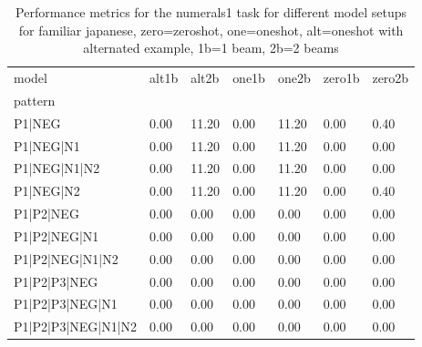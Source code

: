 \begin{table}[h]
\begin{tabular}{l|llllll}
\toprule
model & alt1b & alt2b & one1b & one2b & zero1b & zero2b \\
pattern &  &  &  &  &  &  \\
\midrule
P1|NEG & 0.00 & 11.20 & 0.00 & 11.20 & 0.00 & 0.40 \\
P1|NEG|N1 & 0.00 & 11.20 & 0.00 & 11.20 & 0.00 & 0.00 \\
P1|NEG|N1|N2 & 0.00 & 11.20 & 0.00 & 11.20 & 0.00 & 0.00 \\
P1|NEG|N2 & 0.00 & 11.20 & 0.00 & 11.20 & 0.00 & 0.40 \\
P1|P2|NEG & 0.00 & 0.00 & 0.00 & 0.00 & 0.00 & 0.00 \\
P1|P2|NEG|N1 & 0.00 & 0.00 & 0.00 & 0.00 & 0.00 & 0.00 \\
P1|P2|NEG|N1|N2 & 0.00 & 0.00 & 0.00 & 0.00 & 0.00 & 0.00 \\
P1|P2|P3|NEG & 0.00 & 0.00 & 0.00 & 0.00 & 0.00 & 0.00 \\
P1|P2|P3|NEG|N1 & 0.00 & 0.00 & 0.00 & 0.00 & 0.00 & 0.00 \\
P1|P2|P3|NEG|N1|N2 & 0.00 & 0.00 & 0.00 & 0.00 & 0.00 & 0.00 \\
\bottomrule
\end{tabular}
\caption{Performance metrics for the numerals1 task for different model setups for familiar japanese, zero=zeroshot, one=oneshot, alt=oneshot with alternated example, 1b=1 beam, 2b=2 beams}
\label{tab:ja fam_numerals1_performance}
\end{table}
